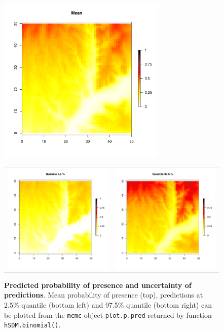 \documentclass[a4paper, 12pt, leqno]{article}\usepackage[]{graphicx}\usepackage[]{color}
\begin{document}
\begin{figure} 
  \centering \includegraphics[width=8cm]{figures/predictions-binomial1.pdf} \\
  \begin{tabular}{cc}
    \includegraphics[width=8cm]{figures/predictions-binomial2.pdf} &
    \includegraphics[width=8cm]{figures/predictions-binomial3.pdf} \\
  \end{tabular}
  
  \caption{\textbf{Predicted probability of presence and uncertainty of predictions}. Mean
    probability of presence (top), predictions at 2.5\% quantile (bottom left) and 97.5\%
    quantile (bottom right) can be plotted from the \texttt{mcmc} object
    \texttt{plot.p.pred} returned by function \texttt{hSDM.binomial()}.}
  
  \label{fig:predictions-binomial}
  
\end{figure}
\end{document}
